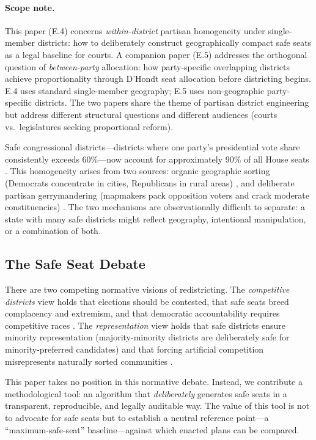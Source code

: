 \paragraph{Scope note.}
This paper (E.4) concerns \emph{within-district} partisan homogeneity under single-member districts: how to deliberately construct geographically compact safe seats as a legal baseline for courts.
A companion paper (E.5) addresses the orthogonal question of \emph{between-party} allocation: how party-specific overlapping districts achieve proportionality through D'Hondt seat allocation before districting begins.
E.4 uses standard single-member geography; E.5 uses non-geographic party-specific districts.
The two papers share the theme of partisan district engineering but address different structural questions and different audiences (courts vs.\ legislatures seeking proportional reform).

Safe congressional districts---districts where one party's presidential vote
share consistently exceeds 60\%---now account for approximately 90\% of all
House seats \citep{cook2020competitive}.  This homogeneity arises from two
sources: organic geographic sorting (Democrats concentrate in cities,
Republicans in rural areas) \citep{bishop2009bigSort}, and deliberate
partisan gerrymandering (mapmakers pack opposition voters and crack moderate
constituencies) \citep{stephanopoulos2015partisan}.  The two mechanisms are
observationally difficult to separate: a state with many safe districts might
reflect geography, intentional manipulation, or a combination of both.

\subsection{The Safe Seat Debate}

There are two competing normative visions of redistricting.  The
\emph{competitive districts} view holds that elections should be contested,
that safe seats breed complacency and extremism, and that democratic
accountability requires competitive races \citep{jacobson2015politics}.  The
\emph{representation} view holds that safe districts ensure minority
representation (majority-minority districts are deliberately safe for
minority-preferred candidates) and that forcing artificial competition
misrepresents naturally sorted communities \citep{rush2000redistricting}.

This paper takes no position in this normative debate.  Instead, we contribute
a methodological tool: an algorithm that \emph{deliberately} generates safe
seats in a transparent, reproducible, and legally auditable way.  The value
of this tool is not to advocate for safe seats but to establish a neutral
reference point---a ``maximum-safe-seat'' baseline---against which enacted
plans can be compared.

